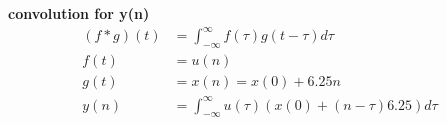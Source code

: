 \documentclass[journal,12pt,twocolumn]{IEEEtran}
\theoremstyle{remark}
\begin{document}
\textbf{{convolution for y(n)}}
\begin{align}
(f*g)(t)&=\int_{-\infty}^{\infty}{f({\tau})g(t-{\tau})d\tau}
\\f(t)&=u(n)
\\g(t)&=x(n)=x(0)+6.25n
\\y(n)&=\int_{-\infty}^{\infty}{u({\tau})(x(0)+(n-\tau)6.25)d\tau}
\end{align}
 
\end{document}
